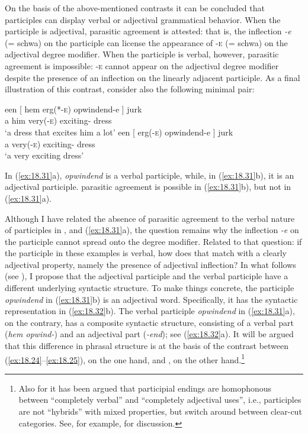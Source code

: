 \documentclass[output=paper]{langsci/langscibook}
\begin{document}
On the basis of the above-mentioned contrasts it can be concluded that
participles can display verbal or adjectival grammatical behavior. When the
participle is adjectival, parasitic agreement is attested: that is, the
inflection \emph{-e} (= schwa) on the participle can license the appearance of
\textsc{-e} (= schwa) on the adjectival degree modifier. When the participle is
verbal, however, parasitic agreement is impossible: -\textsc{e} cannot appear
on the adjectival degree modifier despite the presence of an inflection on the
linearly adjacent participle. As a final illustration of this contrast,
consider also the following minimal pair:

\ea%
    \label{ex:18.31}
	\ea
	\gll een   [ hem    erg(*-\textsc{e})  opwindend-e ]    jurk\\
    a      {}  him    very(-\textsc{e})    exciting-\Agr{} {} dress\\
	\glt \enquote*{a dress that excites him a lot}
	\ex
	\gll een   [ erg(-\textsc{e})    opwindend-e ]    jurk\\
    a    {}  very(-\textsc{e})    exciting-\Agr{} {}  dress\\
	\glt \enquote*{a very exciting dress}
	\z
\z

In (\ref{ex:18.31}a), \emph{opwindend} is a verbal participle, while, in
(\ref{ex:18.31}b), it is an adjectival participle. parasitic agreement is
possible in (\ref{ex:18.31}b), but not in (\ref{ex:18.31}a).

Although I have related the absence of parasitic agreement to the verbal nature
of participles in ,  and (\ref{ex:18.31}a), the
question remains why the inflection \emph{-e} on the participle cannot spread
onto the degree modifier. Related to that question: if the participle in these
examples is verbal, how does that match with a clearly adjectival property,
namely the presence of adjectival inflection? In what follows (see
), I propose that the adjectival participle and the verbal
participle have a different underlying syntactic structure. To make things
concrete, the participle \emph{opwindend} in (\ref{ex:18.31}b) is an adjectival
word. Specifically, it has the syntactic representation in (\ref{ex:18.32}b).
The verbal participle \emph{opwindend} in (\ref{ex:18.31}a), on the contrary,
has a composite syntactic structure, consisting of a verbal part (\emph{hem
opwind-}) and an adjectival part (\emph{-end}); see (\ref{ex:18.32}a). It will
be argued that this difference in phrasal structure is at the basis of the
contrast between (\ref{ex:18.24}--\ref{ex:18.25}), on the one hand, and , on
the other hand.\footnote{Also for  it has been argued that participial
endings are homophonous between \enquote{completely verbal} and
\enquote{completely adjectival uses}, i.e., participles are not
\enquote{hybrids} with mixed properties, but switch around between clear-cut
categories. See, for example, \citet{Toman1986} for discussion.}
\end{document}
